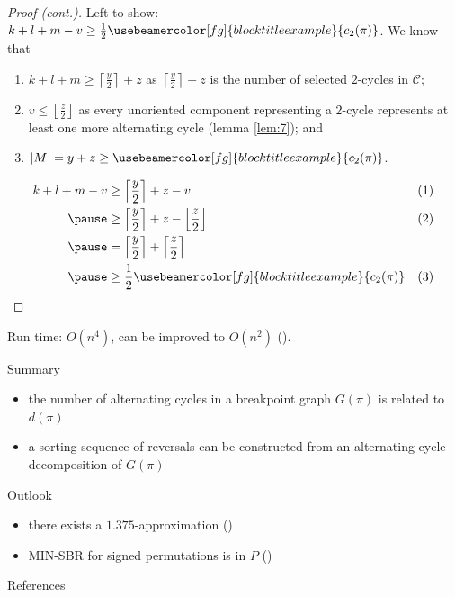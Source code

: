 \documentclass[handout]{beamer}
\theoremstyle{definition}
\def\spadding{\vspace{0.25cm}}
\def\g#1{{\usebeamercolor[fg]{block title example}{#1}}}
\begin{document}
\begin{frame}

\begin{proof}[Proof (cont.)]
Left to show: $k+l+m-v \geq \frac{1}{2} \g{c_2(\pi)}$. \pause We know that
\begin{enumerate}
    \item $k+l+m \geq \left\lceil \frac{y}{2} \right\rceil + z$ as $\left\lceil \frac{y}{2} \right\rceil + z$ is the number of selected $2$-cycles in $\mathcal{C}$\pause;
    \item $v \leq \left\lfloor \frac{z}{2} \right\rfloor$ as every unoriented component representing a $2$-cycle represents at least one more alternating cycle (lemma \ref{lem:7})\pause; and
    \item $|M| = y+z \geq \g{c_2(\pi)}$.
\end{enumerate}\pause
\begin{align*}
    k+l+m-v &\geq \left\lceil \frac{y}{2} \right\rceil + z - v                                          & (1) \\ \pause
            &\geq \left\lceil \frac{y}{2} \right\rceil + z - \left\lfloor \frac{z}{2} \right\rfloor     & (2) \\ \pause
            &= \left\lceil \frac{y}{2} \right\rceil + \left\lceil \frac{z}{2} \right\rceil \\ \pause
            &\geq \frac{1}{2} \g{c_2(\pi)}                                                              & (3)
\end{align*}
\end{proof}

\end{frame}

\begin{frame}

Run time: $O(n^4)$, can be improved to $O(n^2)$ (\citeauthor*{Kaplan1997}).\spadding

\begin{block}{Summary}
\begin{itemize}
    \item the number of alternating cycles in a breakpoint graph $G(\pi)$ is related to $d(\pi)$
    \item a sorting sequence of reversals can be constructed from an alternating cycle decomposition of $G(\pi)$
\end{itemize}
\end{block}

\begin{block}{Outlook}
\begin{itemize}
    \item there exists a $1.375$-approximation (\citeauthor*{Berman2001})
    \item MIN-SBR for signed permutations is in $P$ (\citeauthor*{Hannenhalli1995})
\end{itemize}
\end{block}

\end{frame}

\begin{frame}[allowframebreaks]{References}

\printbibliography

\end{frame}
\end{document}
